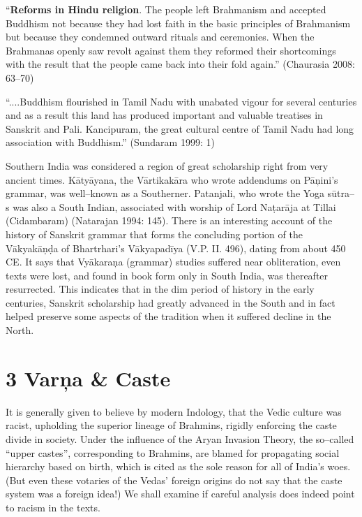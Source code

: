 \vskip 2pt

\begin{myquote}
“\textbf{Reforms in Hindu religion}. The people left Brahmanism and accepted Buddhism not because they had lost faith in the basic principles of Brahmanism but because they condemned outward rituals and ceremonies. When the Brahmanas openly saw revolt against them they reformed their shortcomings with the result that the people came back into their fold again.” (Chaurasia 2008: 63–70)
\end{myquote}

\vskip 2pt

\begin{myquote}
“....Buddhism flourished in Tamil Nadu with unabated vigour for several centuries and as a result this land has produced important and valuable treatises in Sanskrit and Pali. Kancipuram, the great cultural centre of Tamil Nadu had long association with Buddhism.” (Sundaram 1999: 1)
\end{myquote}

\vskip 2pt

Southern India was considered a region of great scholarship right from very ancient times. Kātyāyana, the Vārtikakāra who wrote addendums on Pāņini’s grammar, was well–known as a Southerner. Patanjali, who wrote the Yoga sūtra–s was also a South Indian, associated with worship of Lord Naṭarāja at Tillai (Cidambaram) (Natarajan 1994: 145). There is an interesting account of the history of Sanskrit grammar that forms the concluding portion of the Vākyakāņḍa of Bhartrhari’s Vākyapadīya (V.P. II. 496), dating from about 450 CE. It says that Vyākaraņa (grammar) studies suffered near obliteration, even texts were lost, and found in book form only in South India, was thereafter resurrected. This indicates that in the dim period of history in the early centuries, Sanskrit scholarship had greatly advanced in the South and in fact helped preserve some aspects of the tradition when it suffered decline in the North.

\vskip 2pt


\section*{3 Varņa \& Caste}

It is generally given to believe by modern Indology, that the Vedic culture was racist, upholding the superior lineage of Brahmins, rigidly enforcing the caste divide in society. Under the influence of the Aryan Invasion Theory, the so–called “upper castes”, corresponding to Brahmins, are blamed for propagating social hierarchy based on birth, which is cited as the sole reason for all of India’s woes. (But even these votaries of the Vedas’ foreign origins do not say that the caste system was a foreign idea!) We shall examine if careful analysis does indeed point to racism in the texts.


